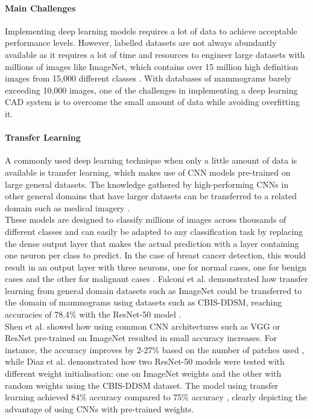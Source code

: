 \paragraph{Main Challenges}

Implementing deep learning models requires a lot of data to achieve acceptable performance levels. However, labelled datasets are not always abundantly available as it requires a lot of time and resources to engineer large datasets with millions of images \citep{Krizhevsky2012} like ImageNet, which contains over 15 million high definition images from 15,000 different classes \citep{Deng2010}. With databases of mammograms barely exceeding 10,000 images, one of the challenges in implementing a deep learning CAD system is to overcome the small amount of data while avoiding overfitting it.

\paragraph{Transfer Learning}

A commonly used deep learning technique when only a little amount of data is available is transfer learning, which makes use of CNN models pre-trained on large general datasets. The knowledge gathered by high-performing CNNs in other general domains that have larger datasets can be transferred to a related domain such as medical imagery \citep{Falconi2019}.\\

These models are designed to classify millions of images across thousands of different classes and can easily be adapted to any classification task by replacing the dense output layer that makes the actual prediction with a layer containing one neuron per class to predict. In the case of breast cancer detection, this would result in an output layer with three neurons, one for normal cases, one for benign cases and the other for malignant cases \citep{Geron2019}. Falconi et al. demonstrated how transfer learning from general domain datasets such as ImageNet could be transferred to the domain of mammograms using datasets  such as CBIS-DDSM, reaching accuracies of 78.4\% with the ResNet-50 model \citep{Falconi2019}.\\

Shen et al. showed how using common CNN architectures such as VGG or ResNet pre-trained on ImageNet resulted in small accuracy increases. For instance, the accuracy improves by 2-27\% based on the number of patches used \citep{Shen2017}, while Diaz et al. demonstrated how two ResNet-50 models were tested with different weight initialisation: one on ImageNet weights and the other with random weights using the CBIS-DDSM dataset. The model using transfer learning achieved  84\% accuracy compared to 75\% accuracy \citep{Diaz2018}, clearly depicting the advantage of using CNNs with pre-trained weights. 

